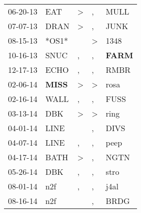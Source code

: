 \begin{supertabular}{p{0.07\textwidth}p{0.06\textwidth}p{0.02\textwidth}p{0.02\textwidth}p{0.06\textwidth}}
          06-20-13\textsuperscript{} &            EAT\textsuperscript{} &     \textgreater &                , &           MULL\textsuperscript{} \\
          07-07-13\textsuperscript{} &           DRAN\textsuperscript{} &     \textgreater &                , &           JUNK\textsuperscript{} \\
          08-15-13\textsuperscript{} &                            *OS1* &                  &     \textgreater &           1348\textsuperscript{} \\
          10-16-13\textsuperscript{} &           SNUC\textsuperscript{} &                , &                , &  \textbf{FARM\textsuperscript{}} \\
          12-17-13\textsuperscript{} &           ECHO\textsuperscript{} &                , &                , &           RMBR\textsuperscript{} \\
          02-06-14\textsuperscript{} &  \textbf{MISS\textsuperscript{}} &     \textgreater &     \textgreater &           rosa\textsuperscript{} \\
          02-16-14\textsuperscript{} &           WALL\textsuperscript{} &                , &                , &           FUSS\textsuperscript{} \\
          03-13-14\textsuperscript{} &            DBK\textsuperscript{} &     \textgreater &     \textgreater &           ring\textsuperscript{} \\
          04-01-14\textsuperscript{} &           LINE\textsuperscript{} &                  &                , &           DIVS\textsuperscript{} \\
          04-07-14\textsuperscript{} &           LINE\textsuperscript{} &                , &                , &           peep\textsuperscript{} \\
          04-17-14\textsuperscript{} &           BATH\textsuperscript{} &     \textgreater &                , &           NGTN\textsuperscript{} \\
          05-26-14\textsuperscript{} &            DBK\textsuperscript{} &                , &                , &           stro\textsuperscript{} \\
          08-01-14\textsuperscript{} &            n2f\textsuperscript{} &                , &                , &           j4al\textsuperscript{} \\
          08-16-14\textsuperscript{} &            n2f\textsuperscript{} &                  &                , &           BRDG\textsuperscript{} \\

\end{supertabular}
